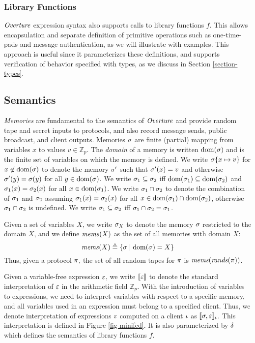 \subsubsection{Library Functions} $\mathit{Overture}$ expression syntax also supports
calls to library functions $f$. This allows encapsulation and separate
definition of primitive operations such as one-time-pads and message
authentication, as we will illustrate with examples. This approach is
useful since it parameterizes these definitions, and 
supports verification of behavior specified with types, as we
discuss in Section \ref{section-types}.

\subsection{Semantics}

\emph{Memories} are fundamental to the semantics of $\mathit{Overture}$ and
provide random tape and secret inputs to protocols, and also record
message sends, public broadcast, and client outputs. Memories $\sigma$ are finite
(partial) mapping from variables $x$ to values $v \in \mathbb{Z}_p$. The \emph{domain} of a
memory is written $\mathrm{dom}(\sigma)$ and is the finite set of variables on
which the memory is defined. We write $\sigma\{ x \mapsto v\}$ for
$x\not\in\mathrm{dom}(\sigma)$ to denote the memory $\sigma'$ such that
$\sigma'(x) = v$ and otherwise $\sigma'(y) = \sigma(y)$ for all $y
\in \mathrm{dom}(\sigma)$. We write $\sigma_1 \subseteq \sigma_2$ iff
$\mathrm{dom}(\sigma_1) \subseteq \mathrm{dom}(\sigma_2)$ and $\sigma_1(x) =
\sigma_2(x)$ for all $x \in \mathrm{dom}(\sigma_1)$. We write $\sigma_1 \cap
\sigma_2$ to denote the combination of $\sigma_1$ and $\sigma_2$
assuming $\sigma_1(x) = \sigma_2(x)$ for all $x \in \mathrm{dom}(\sigma_1)
\cap \mathrm{dom}(\sigma_2)$, otherwise $\sigma_1 \cap \sigma_2$ is undefined.
We write $\sigma_1 \subseteq \sigma_2$ iff $\sigma_1 \cap \sigma_2
= \sigma_1$.

Given a set of variables $X$, we write $\sigma_X$ to denote the
memory $\sigma$ restricted to the domain $X$, and we define
$\mathit{mems}(X)$ as the set of all memories with domain $X$:
$$
\mathit{mems}(X) \triangleq \{ \sigma \mid \mathrm{dom}(\sigma) = X \}
$$
Thus, given a protocol $\pi$, the set of all random tapes for
$\pi$ is $\mathit{mems}(\mathit{rands}(\pi))$.

Given a variable-free expression $\varepsilon$, we write $\llbracket \varepsilon \rrbracket$ to denote
the standard interpretation of $\varepsilon$ in the arithmetic field
$\mathbb{Z}_{p}$. With the introduction of variables to expressions,
we need to interpret variables with respect to a specific memory, and
all variables used in an expression must belong to a specified client.
Thus, we denote interpretation of expressions $\varepsilon$ computed on a
client $\iota$ as $\llbracket \sigma,\varepsilon \rrbracket_{\iota}$. This interpretation is
defined in Figure \ref{fig-minifed}. It is also parameterized by
$\delta$ which defines the semantics of library functions $f$.

